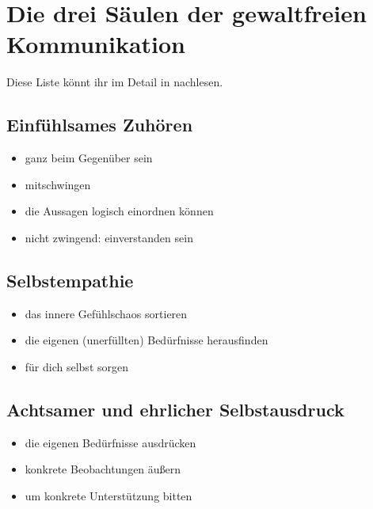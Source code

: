 \section{Die drei Säulen der gewaltfreien Kommunikation}
\label{gfk-saeulen}

Diese Liste könnt ihr im Detail in \cite[S. 33f]{gfk-dummies} nachlesen.


\subsection{Einfühlsames Zuhören}

\begin{itemize}
 \item ganz beim Gegenüber sein
 \item mitschwingen
 \item die Aussagen logisch einordnen können
 \item nicht zwingend: einverstanden sein
\end{itemize}


\subsection{Selbstempathie}

\begin{itemize}
 \item das innere Gefühlschaos sortieren
 \item die eigenen (unerfüllten) Bedürfnisse herausfinden
 \item für dich selbst sorgen
\end{itemize}


\subsection{Achtsamer und ehrlicher Selbstausdruck}

\begin{itemize}
 \item die eigenen Bedürfnisse ausdrücken
 \item konkrete Beobachtungen äußern
 \item um konkrete Unterstützung bitten
\end{itemize}
